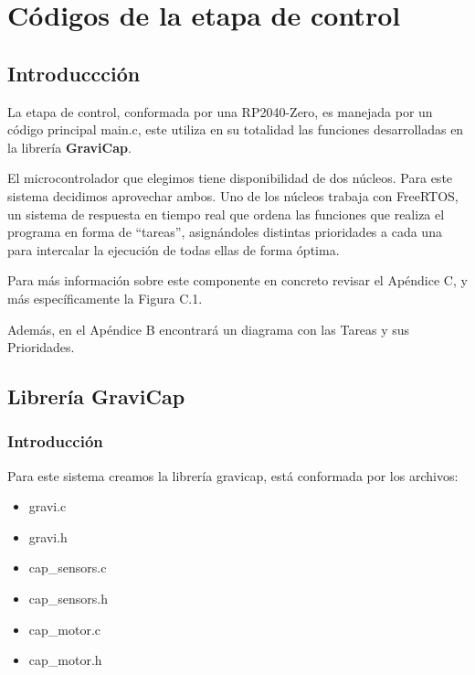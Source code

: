         \section{Códigos de la etapa de control}
        
            \subsection{Introduccción}
                La etapa de control, conformada por una RP2040-Zero, es manejada por un código principal main.c, este utiliza en su totalidad las funciones desarrolladas en la librería \textcolor{dark_violet}{\textbf{GraviCap}}.\par
                El microcontrolador que elegimos tiene disponibilidad de dos núcleos. Para este sistema decidimos aprovechar ambos. Uno de los núcleos trabaja con FreeRTOS, un sistema de respuesta en tiempo real que ordena las funciones que realiza el programa en forma de “tareas”, asignándoles distintas prioridades a cada una para intercalar la ejecución de todas ellas de forma óptima.\par
                Para más información sobre este componente en concreto revisar el Apéndice C, y más específicamente la Figura C.1.\par
                Además, en el Apéndice B encontrará un diagrama con las Tareas y sus Prioridades.\par
            \subsection{Librería \textcolor{dark_violet}{\textbf{GraviCap}}}
                \subsubsection{Introducción}
                    Para este sistema creamos la librería gravicap, está conformada por los archivos:\par
                    \begin{itemize} [label=•]
                    \setlength{\itemindent}{1.5em}
                    
                        \item gravi.c
                        \item gravi.h
                        \item cap\_sensors.c
                        \item cap\_sensors.h
                        \item cap\_motor.c
                        \item cap\_motor.h
                    \end{itemize}
    
